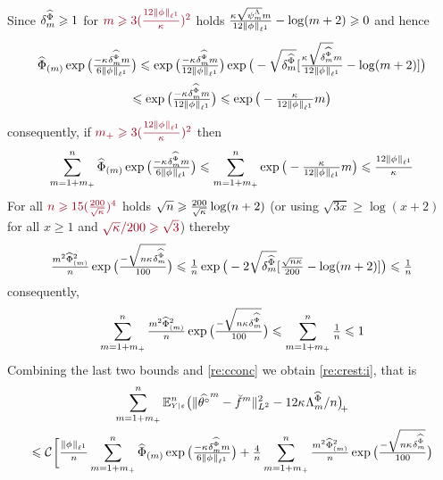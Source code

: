\begin{pro}\label{pro:crest}
Since $\cmeiSv\geq1$ for $\dr\Di\geq
3(\tfrac{12\Vnormlp[1]{\fydf}}{\cpen})^2$ 
holds
$\tfrac{\cpen\sqrt{\cmSv}\Di}{12\Vnormlp[1]{\fydf}}-\log(\Di+2)\geq0$
and hence
\begin{multline*}
\meiSv\exp\big(\tfrac{-\cpen\cmeiSv\Di}{6\Vnormlp[1]{\fydf}}\big)\leq
\exp\big(\tfrac{-\cpen\cmeiSv\Di}{12\Vnormlp[1]{\fydf}}\big)\exp\big(-\sqrt{\cmeiSv}[\tfrac{\cpen\sqrt{\cmeiSv}\Di}{12\Vnormlp[1]{\fydf}}-\log(\Di+2)]\big)
\\\leq\exp\big(\tfrac{-\cpen\cmeiSv\Di}{12\Vnormlp[1]{\fydf}}\big)\leq\exp\big(-\tfrac{\cpen}{12\Vnormlp[1]{\fydf}}\Di\big)
\end{multline*}
consequently, if $\dr\pDi\geq 3(\tfrac{12\Vnormlp[1]{\fydf}}{\cpen})^2$ then
\begin{multline*}
\sum_{\Di=1+\pDi}^{\ssY}\meiSv\exp\big(\tfrac{-\cpen\cmeiSv\Di}{6\Vnormlp[1]{\fydf}}\big)\leq
\sum_{\Di=1+\pDi}^{\ssY}\exp\big(-\tfrac{\cpen}{12\Vnormlp[1]{\fydf}}\Di\big)
\leq \tfrac{12\Vnormlp[1]{\fydf}}{\cpen}
\end{multline*}
For all $\dr n\geq 15(\tfrac{200}{\sqrt{\cpen}})^4$ holds
$\sqrt{n}\geq\tfrac{200}{\sqrt{\cpen}}\log(n+2)$
 (or using $\sqrt{3x}\geq\log(x+2)$ for all $x\geq1$ and
 $\dr\sqrt{\cpen}/200\geq\sqrt{3}$) thereby
\begin{multline*}
\tfrac{\Di^2\meiSv^2}{\ssY}\exp\big(\tfrac{-\sqrt{n\cpen\cmeiSv}}{100}\big)
\leq
\tfrac{1}{\ssY}\exp\big(-2\sqrt{\cmeiSv}[\tfrac{\sqrt{\ssY\cpen}}{200}-\log(\Di+2)]\big)%
\leq \tfrac{1}{\ssY}
\end{multline*}
consequently, 
\begin{multline*}
\sum_{\Di=1+\pDi}^{\ssY}\tfrac{\Di^2\meiSv^2}{\ssY}\exp\big(\tfrac{-\sqrt{n\cpen\cmeiSv}}{100}\big)\leq\sum_{\Di=1+\pDi}^{\ssY}\tfrac{1}{\ssY}\leq1
\end{multline*}
Combining the last two bounds and \cref{re:cconc} we obtain \ref{re:crest:i}, that is 
\begin{multline*}
\sum_{\Di=1+\pDi}^{\ssY}\FuEx[\ssY]{\rY|\rE}\vectp{\VnormLp{\hxdfPr[\Di]-\dxdfPr[\Di]}^2-\epenSv}\\\hfill\leq \cst{}\bigg[\tfrac{\Vnormlp[1]{\fydf}}{\ssY}\sum_{\Di=1+\pDi}^{\ssY}
\meiSv\exp\big(\tfrac{-\cpen\cmeiSv\Di}{6\Vnormlp[1]{\fydf}}\big)+\tfrac{4}{n}\sum_{\Di=1+\pDi}^{\ssY}\tfrac{\Di^2\meiSv^2}{n}\exp\big(\tfrac{-\sqrt{n\cpen\cmeiSv}}{100}\big)

\end{multline*}
\end{pro}
